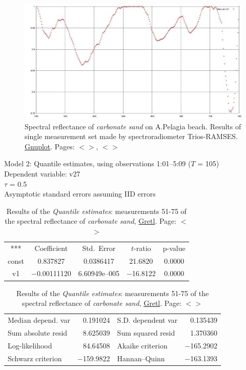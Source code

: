 \documentclass[11pt]{article}
\begin{document}
\begin{appendices}
\begin{figure}[H]
	\centering
	\includegraphics[scale=0.5]{Fig-26.jpg}
	\caption{Spectral reflectance of \textit{carbonate sand} on A.Pelagia beach. Results of single measurement set made by spectroradiometer \ac{Trios-RAMSES}. \href{http://www.gnuplot.info/}{Gnuplot}. Pages: $<$\pageref{page-28}$>$, $<$\pageref{page-39}$>$}
	\label{fig:A.35}
\end{figure}
\begin{table}[H]\footnotesize
	\caption{Results of the \textit{Quantile estimates}: measurements 51-75 of the spectral reflectance of \textit{carbonate sand}, \href{http://gretl.sourceforge.net/}{Gretl}. Page: $<$\pageref{page-41}$>$}
	\begin{center}
		Model 2: Quantile estimates, using observations 1:01--5:09 ($T$ = 105)\\
		Dependent variable: v27\\
		$\tau$ = 0.5\\
		Asymptotic standard errors assuming IID errors\\

\vspace{1em}

\begin{tabular}{c c c c c}
	***   & {Coefficient} & {Std.\ Error} & {$t$-ratio} & {p-value} \\[1ex]
	const &  0.837827 &    0.0386417 &      21.6820 &         0.0000 \\
	v1 &   $-$0.00111120 &     6.60949\textrm{e--005} &       $-$16.8122 &         0.0000 \\ \hline \hline
\end{tabular}

\vspace{1ex}
	\begin{tabular}{lrlr}
		Median depend. var &  0.191024 & S.D. dependent var &  0.135439 \\
		Sum absolute resid &  8.625039 & Sum squared resid &  1.370360 \\
		Log-likelihood &  84.64508 & Akaike criterion & $-$165.2902 \\
		Schwarz criterion & $-$159.9822 & Hannan--Quinn & $-$163.1393 \\ \hline \hline
	\end{tabular}
	\end{center}
\label{tab:29}
\end{table}


\end{appendices}
\end{document}
